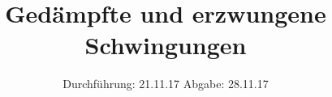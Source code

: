 

\subject{V354}
\title{Gedämpfte und erzwungene Schwingungen}
\date{
  Durchführung: 21.11.17
  \hspace{3em}
  Abgabe: 28.11.17
}



\maketitle
\thispagestyle{empty}
\tableofcontents
\newpage









\newpage
\printbibliography



